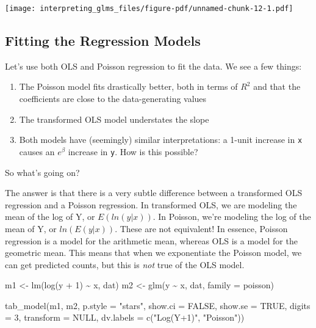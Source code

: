 \documentclass[
  letterpaper,
  DIV=11,
  numbers=noendperiod]{scrreprt}
\newenvironment{Shaded}{}{}
\newcommand{\AttributeTok}[1]{\textcolor[rgb]{0.49,0.56,0.16}{#1}}
\newcommand{\ConstantTok}[1]{\textcolor[rgb]{0.53,0.00,0.00}{#1}}
\newcommand{\DecValTok}[1]{\textcolor[rgb]{0.25,0.63,0.44}{#1}}
\newcommand{\FunctionTok}[1]{\textcolor[rgb]{0.02,0.16,0.49}{#1}}
\newcommand{\NormalTok}[1]{#1}
\newcommand{\OtherTok}[1]{\textcolor[rgb]{0.00,0.44,0.13}{#1}}
\newcommand{\SpecialCharTok}[1]{\textcolor[rgb]{0.25,0.44,0.63}{#1}}
\newcommand{\StringTok}[1]{\textcolor[rgb]{0.25,0.44,0.63}{#1}}
\providecommand{\tightlist}{%
  \setlength{\itemsep}{0pt}\setlength{\parskip}{0pt}}\usepackage{longtable,booktabs,array}
\begin{document}
\texttt{[image: interpreting\_glms\_files/figure-pdf/unnamed-chunk-12-1.pdf]}

\subsection{Fitting the Regression
Models}\label{fitting-the-regression-models}

Let's use both OLS and Poisson regression to fit the data. We see a few
things:

\begin{enumerate}
\def\labelenumi{\arabic{enumi}.}
\tightlist
\item
  The Poisson model fits drastically better, both in terms of \(R^2\)
  and that the coefficients are close to the data-generating values
\item
  The transformed OLS model understates the slope
\item
  Both models have (seemingly) similar interpretations: a 1-unit
  increase in \texttt{x} causes an \(e^\beta\) increase in \texttt{y}.
  How is this possible?
\end{enumerate}

So what's going on?

The answer is that there is a very subtle difference between a
transformed OLS regression and a Poisson regression. In transformed OLS,
we are modeling the mean of the log of Y, or \(E(ln(y|x))\). In Poisson,
we're modeling the log of the mean of Y, or \(ln(E(y|x))\). These are
not equivalent! In essence, Poisson regression is a model for the
arithmetic mean, whereas OLS is a model for the geometric mean. This
means that when we exponentiate the Poisson model, we can get predicted
counts, but this is \emph{not} true of the OLS model.

\begin{Shaded}
\begin{Highlighting}[]
\NormalTok{m1 }\OtherTok{\textless{}{-}} \FunctionTok{lm}\NormalTok{(}\FunctionTok{log}\NormalTok{(y }\SpecialCharTok{+} \DecValTok{1}\NormalTok{) }\SpecialCharTok{\textasciitilde{}}\NormalTok{ x, dat)}
\NormalTok{m2 }\OtherTok{\textless{}{-}} \FunctionTok{glm}\NormalTok{(y }\SpecialCharTok{\textasciitilde{}}\NormalTok{ x, dat, }\AttributeTok{family =}\NormalTok{ poisson)}

\FunctionTok{tab\_model}\NormalTok{(m1, m2,}
          \AttributeTok{p.style =} \StringTok{"stars"}\NormalTok{,}
          \AttributeTok{show.ci =} \ConstantTok{FALSE}\NormalTok{,}
          \AttributeTok{show.se =} \ConstantTok{TRUE}\NormalTok{,}
          \AttributeTok{digits =} \DecValTok{3}\NormalTok{,}
          \AttributeTok{transform =} \ConstantTok{NULL}\NormalTok{,}
          \AttributeTok{dv.labels =} \FunctionTok{c}\NormalTok{(}\StringTok{"Log(Y+1)"}\NormalTok{, }\StringTok{"Poisson"}\NormalTok{))}
\end{Highlighting}
\end{Shaded}
\end{document}
